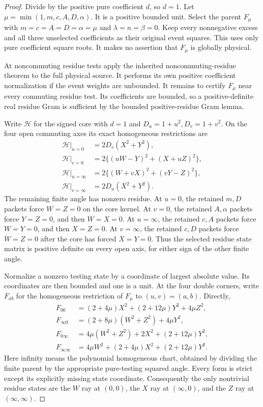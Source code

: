 \begin{proof}
Divide by the positive pure coefficient $d$, so $d=1$.
Let $\mu=\min(1,m,c,A,D,\alpha)$. It is a positive bounded unit.
Select the parent $F_\mu$ with $m=c=A=D=\alpha=\mu$ and
$\lambda=n=\beta=0$. Keep every nonnegative excess and all three
unselected coefficients as their original event squares. This uses only
pure coefficient square roots. It makes no assertion that $F_\mu$ is
globally physical.

At noncommuting residue tests apply
the inherited noncommuting-residue theorem to the full physical source. It
performs its own positive coefficient normalization if the event
weights are unbounded.
It remains to certify $F_\mu$ near every commuting residue test. Its
coefficients are bounded, so a positive-definite real residue Gram is
sufficient by the bounded positive-residue Gram lemma.

Write $\mathcal H$ for the signed core with $d=1$ and
$D_u=1+u^2,D_v=1+v^2$. On the four open commuting axes its exact
homogeneous restrictions are
\[
\begin{aligned}
\mathcal H|_{u=0}&=2D_v(X^2+Y^2),\\
\mathcal H|_{v=0}&=2\{(uW-Y)^2+(X+uZ)^2\},\\
\mathcal H|_{u=\infty}&=2\{(W+vX)^2+(vY-Z)^2\},\\
\mathcal H|_{v=\infty}&=2D_u(X^2+Y^2).
\end{aligned}                                                   \tag{NW1}
\]
The remaining finite angle has nonzero residue. At $u=0$, the retained
$m,D$ packets force $W=Z=0$ on the core kernel. At $v=0$, the retained
$A,\alpha$ packets force $Y=Z=0$, and then $W=X=0$. At $u=\infty$,
the retained $c,A$ packets force $W=Y=0$, and then $X=Z=0$. At
$v=\infty$, the retained $c,D$ packets force $W=Z=0$ after the core
has forced $X=Y=0$. Thus the
selected residue state matrix is positive definite on every open axis,
for either sign of the other finite angle.

Normalize a nonzero testing state by a coordinate of largest absolute
value. Its coordinates are then bounded and one is a unit. At the four
double corners, write $F_{ab}$ for the homogeneous restriction of
$F_\mu$ to $(u,v)=(a,b)$. Directly,
\[
\begin{aligned}
F_{00}&=(2+4\mu)X^2+(2+12\mu)Y^2+4\mu Z^2,\\
F_{\infty0}&=(2+8\mu)(W^2+Z^2)+4\mu Y^2,\\
F_{0\infty}&=4\mu(W^2+Z^2)+2X^2+(2+12\mu)Y^2,\\
F_{\infty\infty}&=4\mu W^2+(2+4\mu)X^2+(2+12\mu)Y^2.
\end{aligned}                                                    \tag{NW2}
\]
Here infinity means the polynomial homogeneous chart, obtained by
dividing the finite parent by the appropriate pure-testing squared
angle. Every form is strict except its explicitly missing state
coordinate. Consequently the only nontrivial residue states are the
$W$ ray at $(0,0)$, the $X$ ray at $(\infty,0)$,
and the $Z$ ray at $(\infty,\infty)$.


\end{proof}
